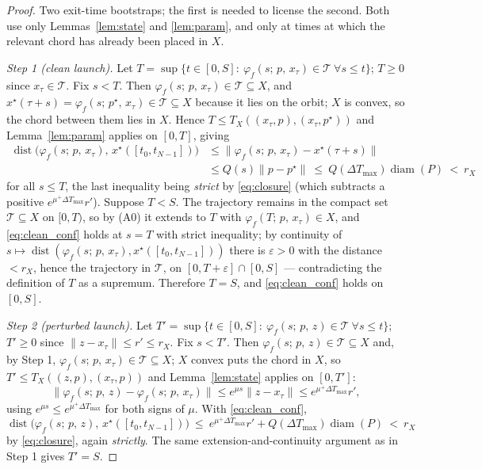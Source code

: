 \documentclass[11pt]{article}
\theoremstyle{remark}\newtheorem{remark}{Remark}
\newcommand{\pstar}{p^\star}
\newcommand{\norm}[1]{\lVert #1\rVert}
\newcommand{\flow}[3]{\varphi_f(#1;\,#2,\,#3)}
\begin{document}
\begin{proof}
Two exit-time bootstraps; the first is needed to license the second. Both use only Lemmas~\ref{lem:state} and \ref{lem:param}, and only at times at which the relevant chord has already been placed in $X$.

\emph{Step 1 (clean launch).} Let $T=\sup\{t\in[0,S]:\ \flow{s}{p}{x_\tau}\in\mathcal T\ \forall s\le t\}$; $T\ge0$ since $x_\tau\in\mathcal T$. Fix $s<T$. Then $\flow{s}{p}{x_\tau}\in\mathcal T\subseteq X$, and $x^\star(\tau+s)=\flow{s}{\pstar}{x_\tau}\in\mathcal T\subseteq X$ because it lies on the orbit; $X$ is convex, so the chord between them lies in $X$. Hence $T\le T_X((x_\tau,p),(x_\tau,\pstar))$ and Lemma~\ref{lem:param} applies on $[0,T]$, giving
\begin{equation}
\begin{aligned}
\operatorname{dist}\big(\flow{s}{p}{x_\tau},\,x^\star([t_0,t_{N-1}])\big)
&\le\norm{\flow{s}{p}{x_\tau}-x^\star(\tau+s)}\\
&\le Q(s)\norm{p-\pstar}\ \le\ Q(\Delta T_{\max})\operatorname{diam}(P)\ <\ r_X
\end{aligned}
\label{eq:clean_conf}
\end{equation}
for all $s\le T$, the last inequality being \emph{strict} by \eqref{eq:closure} (which subtracts a positive $e^{\mu^{+}\Delta T_{\max}}r'$). Suppose $T<S$. The trajectory remains in the compact set $\mathcal T\subseteq X$ on $[0,T)$, so by (A0) it extends to $T$ with $\flow{T}{p}{x_\tau}\in X$, and \eqref{eq:clean_conf} holds at $s=T$ with strict inequality; by continuity of $s\mapsto\operatorname{dist}(\flow{s}{p}{x_\tau},x^\star([t_0,t_{N-1}]))$ there is $\varepsilon>0$ with the distance $<r_X$, hence the trajectory in $\mathcal T$, on $[0,T+\varepsilon]\cap[0,S]$ --- contradicting the definition of $T$ as a supremum. Therefore $T=S$, and \eqref{eq:clean_conf} holds on $[0,S]$.

\emph{Step 2 (perturbed launch).} Let $T'=\sup\{t\in[0,S]:\ \flow{s}{p}{z}\in\mathcal T\ \forall s\le t\}$; $T'\ge0$ since $\norm{z-x_\tau}\le r'\le r_X$. Fix $s<T'$. Then $\flow{s}{p}{z}\in\mathcal T\subseteq X$ and, by Step 1, $\flow{s}{p}{x_\tau}\in\mathcal T\subseteq X$; $X$ convex puts the chord in $X$, so $T'\le T_X((z,p),(x_\tau,p))$ and Lemma~\ref{lem:state} applies on $[0,T']$:
\[
\norm{\flow{s}{p}{z}-\flow{s}{p}{x_\tau}}\le e^{\mu s}\norm{z-x_\tau}\le e^{\mu^{+}\Delta T_{\max}}r' ,
\]
using $e^{\mu s}\le e^{\mu^{+}\Delta T_{\max}}$ for both signs of $\mu$. With \eqref{eq:clean_conf},
\[
\operatorname{dist}\big(\flow{s}{p}{z},\,x^\star([t_0,t_{N-1}])\big)
\ \le\ e^{\mu^{+}\Delta T_{\max}}r'+Q(\Delta T_{\max})\operatorname{diam}(P)\ <\ r_X
\]
by \eqref{eq:closure}, again \emph{strictly}. The same extension-and-continuity argument as in Step 1 gives $T'=S$.
\end{proof}
\end{document}
